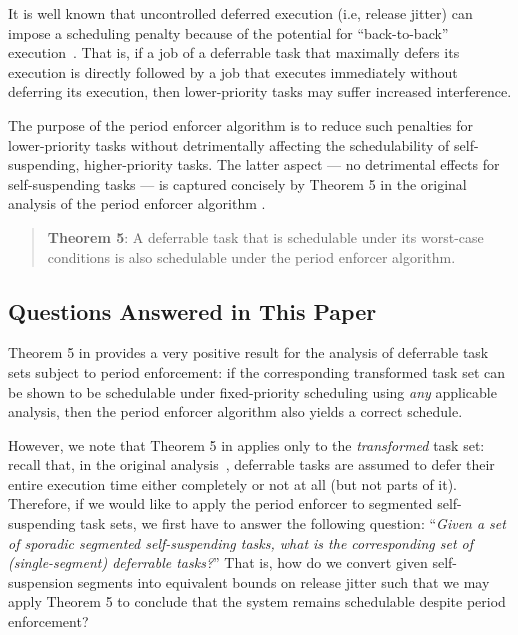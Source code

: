 It is well known that uncontrolled deferred execution (i.e, release jitter) can impose a scheduling penalty because of the potential for ``back-to-back'' execution~\cite{LSS:87,LSST:91,Ra:90,ABRTW:93,SLS:95}. That is, if a job of a deferrable task that maximally defers its execution is directly followed by a job that executes immediately without deferring its execution, then lower-priority tasks may suffer increased interference. 

The purpose of the period enforcer algorithm is to reduce such penalties for lower-priority tasks without detrimentally affecting the schedulability of self-suspending, higher-priority tasks. The latter aspect --- no detrimental effects for self-suspending tasks --- is captured concisely by Theorem 5 in the original analysis of the period enforcer algorithm \cite{Raj:suspension1991}.
\begin{quote}
{\bf Theorem 5}: A deferrable task that is schedulable under its worst-case conditions is also schedulable under the period enforcer algorithm.  \cite{Raj:suspension1991}
\end{quote}

\subsection{Questions Answered in This Paper}
\label{sec:questions}

Theorem 5 in \cite{Raj:suspension1991} provides a very positive result for the analysis of deferrable task sets subject to period enforcement: if the corresponding transformed task set can be shown to be schedulable under fixed-priority scheduling using \emph{any} applicable analysis, then the period enforcer algorithm also yields a correct schedule. 

However, we note that Theorem 5 in \cite{Raj:suspension1991} applies only to the \emph{transformed} task set: recall that, in the original analysis~\cite{Raj:suspension1991}, deferrable tasks are assumed to defer their entire execution time either completely or not at all (but not parts of it).  Therefore, if we would like to apply the period enforcer to segmented self-suspending task sets, we first have to answer the following question: ``\emph{Given a set of sporadic segmented self-suspending tasks, what is the corresponding set of (single-segment) deferrable tasks?}'' That is, how do we convert given self-suspension segments into equivalent bounds on release jitter such that we may apply Theorem 5 to conclude that the system remains schedulable despite period enforcement? 




